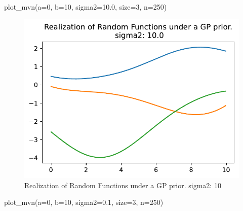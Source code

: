 \documentclass[
  letterpaper,
  DIV=11,
  numbers=noendperiod]{scrreprt}
\newenvironment{Shaded}{\begin{snugshade}}{\end{snugshade}}
\newcommand{\DecValTok}[1]{\textcolor[rgb]{0.68,0.00,0.00}{#1}}
\newcommand{\FloatTok}[1]{\textcolor[rgb]{0.68,0.00,0.00}{#1}}
\newcommand{\NormalTok}[1]{\textcolor[rgb]{0.00,0.23,0.31}{#1}}
\newcommand{\OperatorTok}[1]{\textcolor[rgb]{0.37,0.37,0.37}{#1}}
\begin{document}
\begin{Shaded}
\begin{Highlighting}[]
\NormalTok{plot\_mvn(a}\OperatorTok{=}\DecValTok{0}\NormalTok{, b}\OperatorTok{=}\DecValTok{10}\NormalTok{, sigma2}\OperatorTok{=}\FloatTok{10.0}\NormalTok{, size}\OperatorTok{=}\DecValTok{3}\NormalTok{, n}\OperatorTok{=}\DecValTok{250}\NormalTok{)}
\end{Highlighting}
\end{Shaded}

\begin{figure}[H]

{\centering \includegraphics{006_num_gp_files/figure-pdf/fig-mvn2-output-1.pdf}

}

\caption{\label{fig-mvn2}Realization of Random Functions under a GP
prior. sigma2: 10}

\end{figure}

\begin{Shaded}
\begin{Highlighting}[]
\NormalTok{plot\_mvn(a}\OperatorTok{=}\DecValTok{0}\NormalTok{, b}\OperatorTok{=}\DecValTok{10}\NormalTok{, sigma2}\OperatorTok{=}\FloatTok{0.1}\NormalTok{, size}\OperatorTok{=}\DecValTok{3}\NormalTok{, n}\OperatorTok{=}\DecValTok{250}\NormalTok{)}
\end{Highlighting}
\end{Shaded}
\end{document}
